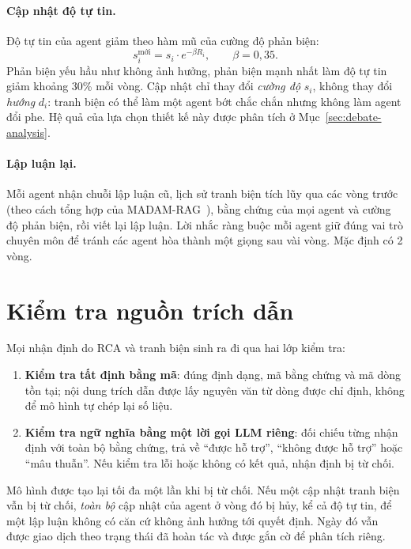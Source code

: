 \paragraph{Cập nhật độ tự tin.} Độ tự tin của agent giảm theo hàm mũ của cường độ phản biện:
\begin{equation}
  s_i^{\text{mới}} = s_i \cdot e^{-\beta R_i},\qquad \beta = 0{,}35.
\end{equation}
Phản biện yếu hầu như không ảnh hưởng, phản biện mạnh nhất làm độ tự tin giảm khoảng 30\% mỗi vòng. Cập nhật chỉ thay
đổi \emph{cường độ} $s_i$, không thay đổi \emph{hướng} $d_i$: tranh biện có thể làm một agent bớt chắc chắn nhưng không
làm agent đổi phe. Hệ quả của lựa chọn thiết kế này được phân tích ở Mục~\ref{sec:debate-analysis}.

\paragraph{Lập luận lại.} Mỗi agent nhận chuỗi lập luận cũ, lịch sử tranh biện tích lũy qua các vòng trước (theo cách
tổng hợp của MADAM-RAG~\cite{wang2025madamrag}), bằng chứng của mọi agent và cường độ phản biện, rồi viết lại lập luận.
Lời nhắc ràng buộc mỗi agent giữ đúng vai trò chuyên môn để tránh các agent hòa thành một giọng sau vài vòng. Mặc định
có 2 vòng.

\section{Kiểm tra nguồn trích dẫn}
\label{sec:grounding}
Mọi nhận định do RCA và tranh biện sinh ra đi qua hai lớp kiểm tra:
\begin{enumerate}
  \item \textbf{Kiểm tra tất định bằng mã}: đúng định dạng, mã bằng chứng và mã dòng tồn tại; nội dung trích dẫn được
  lấy nguyên văn từ dòng được chỉ định, không để mô hình tự chép lại số liệu.
  \item \textbf{Kiểm tra ngữ nghĩa bằng một lời gọi LLM riêng}: đối chiếu từng nhận định với toàn bộ bằng chứng, trả về
  ``được hỗ trợ'', ``không được hỗ trợ'' hoặc ``mâu thuẫn''. Nếu kiểm tra lỗi hoặc không có kết quả, nhận định bị từ chối.
\end{enumerate}
Mô hình được tạo lại tối đa một lần khi bị từ chối. Nếu một cập nhật tranh biện vẫn bị từ chối, \emph{toàn bộ} cập
nhật của agent ở vòng đó bị hủy, kể cả độ tự tin, để một lập luận không có căn cứ không ảnh hưởng tới quyết định. Ngày
đó vẫn được giao dịch theo trạng thái đã hoàn tác và được gắn cờ để phân tích riêng.

